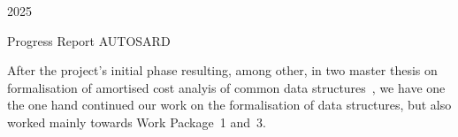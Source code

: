 \documentclass[10pt,a4paper]{article}
\begin{document}

\vspace*{23mm}
\noindent\hspace{35ex}
2025

\vspace*{10mm}

\begin{center}
\large \normalsize Progress Report AUTOSARD 
\end{center}

After the project's initial phase resulting, among other, in two master thesis on formalisation
of amortised cost analyis of common data structures~\cite{Geser:2024,Hochrainer:2024}, we have
one the one hand continued our work on the formalisation of data structures, but also worked mainly
towards Work Package~1 and~3.
\end{document}
